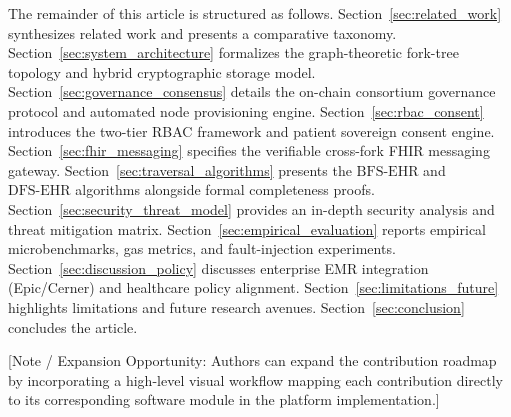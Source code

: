 The remainder of this article is structured as follows. Section~\ref{sec:related_work} synthesizes related work and presents a comparative taxonomy. Section~\ref{sec:system_architecture} formalizes the graph-theoretic fork-tree topology and hybrid cryptographic storage model. Section~\ref{sec:governance_consensus} details the on-chain consortium governance protocol and automated node provisioning engine. Section~\ref{sec:rbac_consent} introduces the two-tier RBAC framework and patient sovereign consent engine. Section~\ref{sec:fhir_messaging} specifies the verifiable cross-fork FHIR messaging gateway. Section~\ref{sec:traversal_algorithms} presents the $\text{BFS-EHR}$ and $\text{DFS-EHR}$ algorithms alongside formal completeness proofs. Section~\ref{sec:security_threat_model} provides an in-depth security analysis and threat mitigation matrix. Section~\ref{sec:empirical_evaluation} reports empirical microbenchmarks, gas metrics, and fault-injection experiments. Section~\ref{sec:discussion_policy} discusses enterprise EMR integration (Epic/Cerner) and healthcare policy alignment. Section~\ref{sec:limitations_future} highlights limitations and future research avenues. Section~\ref{sec:conclusion} concludes the article.

[Note / Expansion Opportunity: Authors can expand the contribution roadmap by incorporating a high-level visual workflow mapping each contribution directly to its corresponding software module in the platform implementation.]
